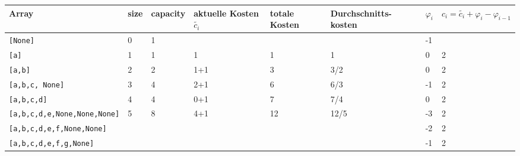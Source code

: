 \begin{tabular}{l | C{0.5cm} C{1.5cm} | C{2cm} | C{1.5cm} | C{2.6cm}| C{1cm} | C{1.5cm}}
    Array & size & capacity & aktuelle Kosten $\tilde{c_i}$ & totale Kosten &  Durchschnitts- kosten & $\varphi_i$  & $c_i = \tilde{c_i} + \varphi_i - \varphi_{i-1}$\\\hline
    \texttt{[None]} & 0 & 1 & & & & -1 & \\
    \texttt{[a]} & 1 & 1 & 1 & 1 & 1 & 0 & 2\\
    \texttt{[a,b]} & 2 & 2 & 1+1 & 3 & 3/2 & 0 & 2\\
    \texttt{[a,b,c, None]} & 3 & 4 & 2+1 & 6 & 6/3 & -1 & 2\\
    \texttt{[a,b,c,d]} & 4 & 4 & 0+1 & 7 & 7/4 & 0 & 2\\
    \texttt{[a,b,c,d,e,None,None,None]} & 5 & 8 & 4+1 & 12 & 12/5 & -3 & 2 \\
    \texttt{[a,b,c,d,e,f,None,None]} & & & & &&-2 & 2\\
    \texttt{[a,b,c,d,e,f,g,None]} & & & & && -1 & 2\\

\end{tabular}


